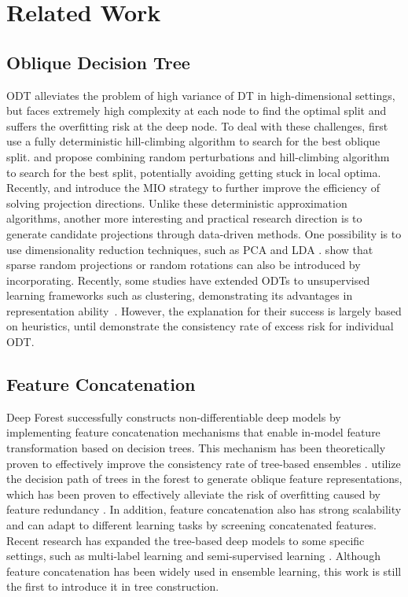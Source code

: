 \section{Related Work}
\label{sec:rlt}

\subsection{Oblique Decision Tree}
ODT alleviates the problem of high variance of DT in high-dimensional settings, but faces extremely high complexity at each node to find the optimal split and suffers the overfitting risk at the deep node. To deal with these challenges, \citet{breiman1984classification} first use a fully deterministic hill-climbing algorithm to search for the best oblique split.
\citet{heath1993induction} and \citet{murthy1994system} propose combining random perturbations and hill-climbing algorithm to search for the best split, potentially avoiding getting stuck in local optima. 
Recently, \citet{bertsimas2017optimal} and \citet{zhu2020scalable} introduce the MIO strategy to further improve the efficiency of solving projection directions.
Unlike these deterministic approximation algorithms, another more interesting and practical research direction is to generate candidate projections through data-driven methods.
One possibility is to use dimensionality reduction techniques, such as PCA \citep{rodriguez2006rotation,menze2011oblique} and LDA \citep{li2003multivariate,lopez2013fisher}.
\citet{tomita2020sparse} show that sparse random projections or random rotations can also be introduced by incorporating.
Recently, some studies have extended ODTs to unsupervised learning frameworks such as clustering, demonstrating its advantages in representation ability~\citep{stepivsnik2021oblique,ganaie2022oblique}.
However, the explanation for their success is largely based on heuristics, until \citet{cattaneo2022convergence} demonstrate the consistency rate of excess risk for individual ODT.

\subsection{Feature Concatenation}
Deep Forest \citep{zhou2017deep} successfully constructs non-differentiable deep models by implementing feature concatenation mechanisms that enable in-model feature transformation based on decision trees. This mechanism has been theoretically proven to effectively improve the consistency rate of tree-based ensembles \citep{arnould2021analyzing,lyu2022depth}. \citet{chen2021improving} utilize the decision path of trees in the forest to generate oblique feature representations, which has been proven to effectively alleviate the risk of overfitting caused by feature redundancy \citep{lyu2022region}.
In addition, feature concatenation also has strong scalability and can adapt to different learning tasks by screening concatenated features. Recent research has expanded the tree-based deep models to some specific settings, such as multi-label learning \citep{yang2020multilabel} and semi-supervised learning \citep{wang2020learning}. 
Although feature concatenation has been widely used in ensemble learning, this work is still the first to introduce it in tree construction.